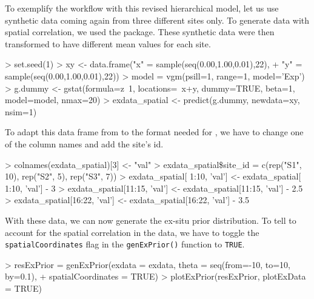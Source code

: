To exemplify the workflow with this revised hierarchical model, let us use synthetic data coming again from three different sites only. 
To generate data with spatial correlation, we used the  package.
These synthetic data were then transformed to have different mean values for each site.

\begin{example}
> set.seed(1)
> xy <- data.frame("x" = sample(seq(0.00,1.00,0.01),22),
+                  "y" = sample(seq(0.00,1.00,0.01),22))
> model = vgm(psill=1, range=1, model='Exp')
> g.dummy <- gstat(formula=z~1, locations=~x+y, dummy=TRUE, beta=1, model=model, nmax=20)
> exdata_spatial <- predict(g.dummy, newdata=xy, nsim=1)
\end{example}

To adapt this data frame from  to the format needed for , we have to change one of the column names and add the site's id.

\begin{example}
> colnames(exdata_spatial)[3] <- "val"
> exdata_spatial\$site_id = c(rep("S1", 10), rep("S2", 5), rep("S3", 7))
> exdata_spatial[ 1:10, 'val'] <- exdata_spatial[ 1:10, 'val'] - 3
> exdata_spatial[11:15, 'val'] <- exdata_spatial[11:15, 'val'] - 2.5
> exdata_spatial[16:22, 'val'] <- exdata_spatial[16:22, 'val'] - 3.5
\end{example}

With these data, we can now generate the ex-situ prior distribution. 
To tell  to account for the spatial correlation in the data, we have to toggle the \texttt{spatialCoordinates} flag in the \texttt{genExPrior()} function to \texttt{TRUE}.

\begin{example}
> resExPrior = genExPrior(exdata = exdata, theta = seq(from=-10, to=10, by=0.1), 
+                         spatialCoordinates = TRUE)
> plotExPrior(resExPrior, plotExData = TRUE)
\end{example}

